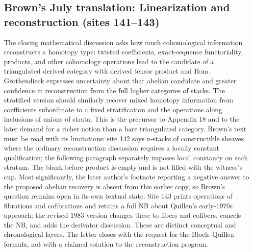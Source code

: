 \subsection*{Brown's July translation: Linearization and reconstruction (sites 141--143)}
The closing mathematical discussion asks how much cohomological information reconstructs a homotopy type: twisted coefficients, exact-sequence functoriality, products, and other cohomology operations lead to the candidate of a triangulated derived category with derived tensor product and Hom. Grothendieck expresses uncertainty about that abelian candidate and greater confidence in reconstruction from the full higher categories of stacks. The stratified version should similarly recover mixed homotopy information from coefficients subordinate to a fixed stratification and the operations along inclusions of unions of strata. This is the precursor to Appendix 18 and to the later demand for a richer notion than a bare triangulated category. Brown's text must be read with its limitations: site 142 says n-stacks of constructible sheaves where the ordinary reconstruction discussion requires a locally constant qualification; the following paragraph separately imposes local constancy on each stratum. The blank before product is empty and is not filled with the witness's cup. Most significantly, the later author's footnote reporting a negative answer to the proposed abelian recovery is absent from this earlier copy, so Brown's question remains open in its own textual state. Site 143 prints operations of fibrations and cofibrations and retains a full NB about Quillen's early-1970s approach; the revised 1983 version changes these to fibers and cofibers, cancels the NB, and adds the derivator discussion. These are distinct conceptual and chronological layers. The letter closes with the request for the Bloch--Quillen formula, not with a claimed solution to the reconstruction program.

